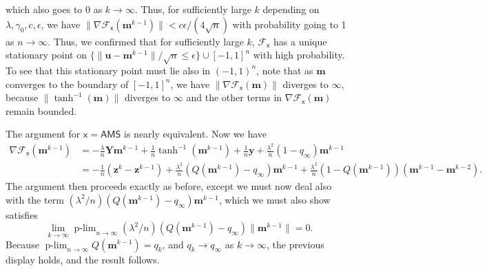 \documentclass[]{article}
\def\sx{{\mathsf x}}
\def\by{{\boldsymbol y}}
\def\cF{{\mathcal F}}
\def\bz{{\boldsymbol z}}
\def\bu{{\boldsymbol u}}
\def\by{{\boldsymbol y}}
\def\cF{{\mathcal F}}
\def\bz{{\boldsymbol z}}
\def\bu{{\boldsymbol u}}
\def\bY{{\boldsymbol Y}}
\def\bbm{{\boldsymbol m}}
\DeclareMathOperator*{\plim}{p-lim}
\def\AMS{\mathsf{AMS}}
\begin{document}
which also goes to 0 as $k \rightarrow \infty$.
Thus, for sufficiently large $k$ depending on $\lambda,\gamma_0,c,\epsilon$,
we have $\| \nabla \cF_{\sx}(\bbm^{k-1})\| < c \epsilon/(4\sqrt{n})$ with probability going to 1 as $n \rightarrow \infty$. 
Thus, we confirmed that for sufficiently large $k$,
$\cF_{\sx}$ has a unique stationary point on $\{ \| \bu - \bbm^{k-1} \| / \sqrt{n} \leq \epsilon \} \cup [-1,1]^n$ with high probability.
To see that this stationary point must lie also in $(-1,1)^n$,
note that as $\bbm$ converges to the boundary of $[-1,1]^n$,
we have $\|\nabla \cF_{\sx}(\bbm)\|$  diverges to $\infty$, because $\| \tanh^{-1}(\bbm)\| $ diverges to $\infty$ and the other terms in $\nabla \cF_{\sx}(\bbm)$ remain bounded.

The argument for $\sx = \AMS$ is nearly equivalent. 
Now we have 
\begin{equation}
\begin{aligned}
    \nabla \cF_{\sx}(\bbm^{k-1})
        &=
        -\frac{\lambda}{n}\bY \bbm^{k-1} + \frac1n \tanh^{-1}(\bbm^{k-1})
        + \frac1n\by
        +\frac{\lambda^2}{n}(1 - q_\infty)\bbm^{k-1}
    \\
        &=
        -\frac1n(\bz^k - \bz^{k-1})
        + \frac{\lambda^2}{n}(Q(\bbm^{k-1}) - q_\infty) \bbm^{k-1}
        + \frac{\lambda^2}{n}(1-Q(\bbm^{k-1}))(\bbm^{k-1}-\bbm^{k-2}).
\end{aligned}
\end{equation}
The argument then proceeds exactly as before, 
except we must now deal also with the term $(\lambda^2/n)(Q(\bbm^{k-1})-q_\infty)\bbm^{k-1}$,
which we must also show satisfies
\begin{equation}
    \lim_{k \rightarrow \infty} \plim_{n \rightarrow \infty} (\lambda^2/n)(Q(\bbm^{k-1})-q_\infty)\|\bbm^{k-1}\| = 0.
\end{equation}
Because $\plim_{n \rightarrow \infty} Q(\bbm^{k-1}) = q_k$, 
and $q_k \rightarrow q_\infty$ as $k \rightarrow \infty$,
the previous display holds, and the result follows.


 
\end{document}
